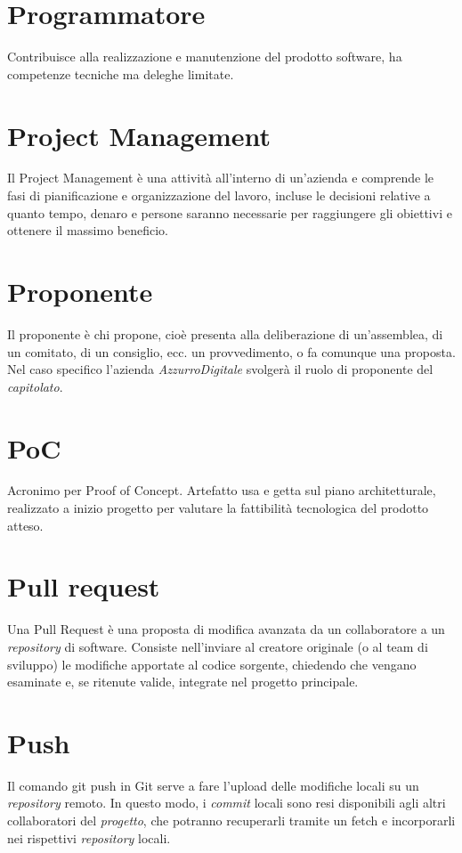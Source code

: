 \section{Programmatore}\label{sec:Programmatori}
Contribuisce alla realizzazione e manutenzione del prodotto software, ha competenze tecniche ma deleghe limitate.

\section{Project Management}
Il Project Management è una attività all’interno di un’azienda e comprende le fasi di pianificazione e organizzazione del lavoro, incluse le decisioni relative a quanto tempo, denaro e persone saranno necessarie per raggiungere gli obiettivi e ottenere il massimo beneficio. 

\section{Proponente}\label{sec:Proponenti}
Il proponente è chi propone, cioè presenta alla deliberazione di un'assemblea, di un comitato, di un consiglio, ecc. un provvedimento, o fa comunque una proposta. Nel caso specifico l'azienda \emph{AzzurroDigitale} svolgerà il ruolo di proponente del \emph{capitolato}.

\section{PoC}\label{sec:Proof of Concept}
Acronimo per Proof of Concept. Artefatto usa e getta sul piano architetturale, realizzato a inizio progetto per valutare la fattibilità tecnologica del prodotto atteso.

\section{Pull request}
Una Pull Request è una proposta di modifica avanzata da un collaboratore a un \emph{repository} di software. Consiste nell'inviare al creatore originale (o al team di sviluppo) le modifiche apportate al codice sorgente, chiedendo che vengano esaminate e, se ritenute valide, integrate nel progetto principale.

\section{Push}
Il comando git push in Git serve a fare l’upload delle modifiche locali su un \emph{repository} remoto. In questo modo, i \emph{commit} locali sono resi disponibili agli altri collaboratori del \emph{progetto}, che potranno recuperarli tramite un fetch e incorporarli nei rispettivi \emph{repository} locali.
